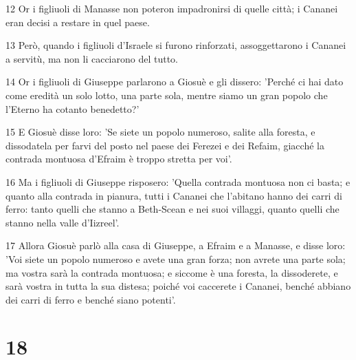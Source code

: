 \par 12 Or i figliuoli di Manasse non poteron impadronirsi di quelle città; i Cananei eran decisi a restare in quel paese.
\par 13 Però, quando i figliuoli d'Israele si furono rinforzati, assoggettarono i Cananei a servitù, ma non li cacciarono del tutto.
\par 14 Or i figliuoli di Giuseppe parlarono a Giosuè e gli dissero: 'Perché ci hai dato come eredità un solo lotto, una parte sola, mentre siamo un gran popolo che l'Eterno ha cotanto benedetto?'
\par 15 E Giosuè disse loro: 'Se siete un popolo numeroso, salite alla foresta, e dissodatela per farvi del posto nel paese dei Ferezei e dei Refaim, giacché la contrada montuosa d'Efraim è troppo stretta per voi'.
\par 16 Ma i figliuoli di Giuseppe risposero: 'Quella contrada montuosa non ci basta; e quanto alla contrada in pianura, tutti i Cananei che l'abitano hanno dei carri di ferro: tanto quelli che stanno a Beth-Scean e nei suoi villaggi, quanto quelli che stanno nella valle d'Iizreel'.
\par 17 Allora Giosuè parlò alla casa di Giuseppe, a Efraim e a Manasse, e disse loro: 'Voi siete un popolo numeroso e avete una gran forza; non avrete una parte sola; ma vostra sarà la contrada montuosa; e siccome è una foresta, la dissoderete, e sarà vostra in tutta la sua distesa; poiché voi caccerete i Cananei, benché abbiano dei carri di ferro e benché siano potenti'.

\chapter{18}


